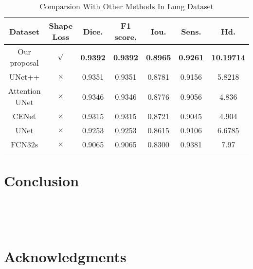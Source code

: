 \documentclass[UTF8]{article} %
\begin{document}
    
  \begin{table}[ht]
    \vspace{-2mm}
    \begin{center}\small
    \caption{Comparsion With Other Methods In Lung\cite{covid19_2} Dataset}
    \label{dataset-table}
    \begin{tabular}{ccccccc}
      
    \toprule
    Dataset & Shape Loss & Dice. & F1 score. & Iou. & Sens. & Hd.\\
    \midrule
      Our proposal & $\surd$ & \textbf{0.9392} & \textbf{0.9392} & \textbf{0.8965} & \textbf{0.9261} & \textbf{10.19714}\\
      UNet++ & $\times$ & 0.9351 & 0.9351 & 0.8781 & 0.9156 & 5.8218\\
      Attention UNet & $\times$ & 0.9346 & 0.9346 & 0.8776 & 0.9056 & 4.836\\
      CENet & $\times$ & 0.9315 & 0.9315 & 0.8721 & 0.9045 & 4.904\\
      UNet & $\times$ & 0.9253 & 0.9253 & 0.8615 & 0.9106 & 6.6785\\
      FCN32s & $\times$ & 0.9065 & 0.9065 & 0.8300 & 0.9381 & 7.97\\
  \bottomrule    
    \end{tabular}
    \end{center}
    \vspace{-4mm}
  \end{table}


\section{Conclusion}
~\\
~\\
~\\

\section*{Acknowledgments}
~\\
~\\
~\\



\end{document}
